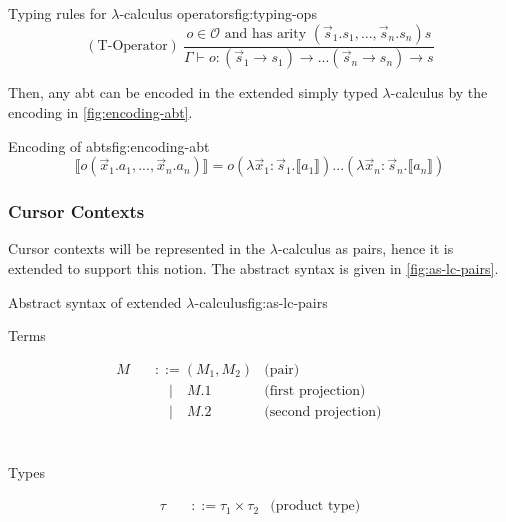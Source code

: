 \begin{myfigure}{Typing rules for $\lambda$-calculus operators}{fig:typing-ops}
    \[
        (\text{T-Operator}) \ \frac{o \in \mathcal{O} \text{ and has arity } (\Vec{s}_1.s_1,...,\Vec{s}_n.s_n)s}{\Gamma \vdash o : (\Vec{s}_1 \rightarrow s_1) \rightarrow ... (\Vec{s}_n \rightarrow s_n) \rightarrow s}
    \]
\end{myfigure}

Then, any abt can be encoded in the extended simply typed $\lambda$-calculus by the encoding in \cref{fig:encoding-abt}.

\begin{myfigure}{Encoding of abts}{fig:encoding-abt}
    \[
        \llbracket o(\Vec{x}_1.a_1,...,\Vec{x}_n.a_n) \rrbracket = o(\lambda \Vec{x}_1:\Vec{s}_1.\llbracket a_1 \rrbracket)...(\lambda \Vec{x}_n : \Vec{s}_n.\llbracket a_n \rrbracket)
    \]
\end{myfigure}

\subsubsection{Cursor Contexts}
Cursor contexts will be represented in the $\lambda$-calculus as pairs, hence it is extended to support this notion. The abstract syntax is given in \cref{fig:as-lc-pairs}.

\begin{myfigure}{Abstract syntax of extended $\lambda$-calculus}{fig:as-lc-pairs}
    \begin{center}
        Terms
    \end{center}
    \[
        \begin{aligned}
            M \quad & ::= (M_1,M_2)     & \text{(pair)}              &  & \\
                    & \quad | \quad M.1 & \text{(first projection)}  &  & \\
                    & \quad | \quad M.2 & \text{(second projection)} &  & \\
        \end{aligned}
    \]
    \\
    \begin{center}
        Types
    \end{center}
    \[
        \begin{aligned}
            \tau \quad & ::= \tau_1 \times \tau_2 & \text{(product type)}
        \end{aligned}
    \]
\end{myfigure}

